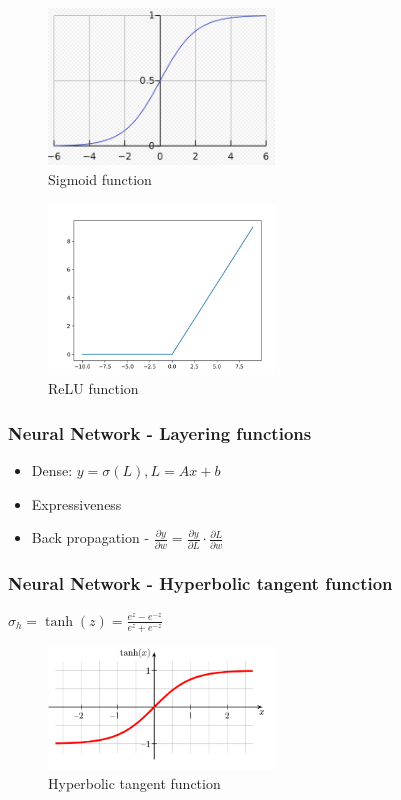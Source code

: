 \documentclass[12pt]{report}
\begin{document}
\begin{figure}[H]\centering\includegraphics[width=6cm]{sigmoid.png}\caption{Sigmoid function}\end{figure}
\begin{figure}[H]\centering\includegraphics[width=6cm]{RELU.png}\caption{ReLU function}\end{figure}

\newpage
\subsubsection{Neural Network - Layering functions}

\begin{itemize}
	\item Dense: $y = \sigma(L), L = Ax+b$
	\item Expressiveness 
	\item Back propagation - $\frac{\partial y}{ \partial w} =  \frac{\partial y}{ \partial L} \cdot \frac{\partial L}{ \partial w}$
\end{itemize}


\subsubsection{Neural Network - Hyperbolic tangent  function}
$\sigma_h = \tanh(z) = \frac{e^z-e^{-z}}{e^z+e^{-z}}$
\begin{figure}[H]\centering\includegraphics[width=6cm]{tanh.png}\caption{Hyperbolic tangent function}\end{figure}
\end{document}

